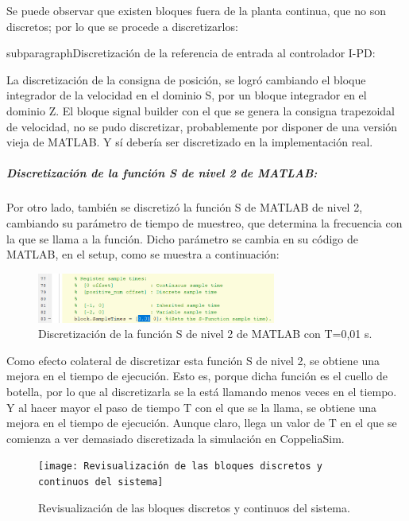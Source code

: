 \documentclass{article}
\begin{document}
\begin{sloppypar}
Se puede observar que existen bloques fuera de la planta continua, que no son discretos; por lo que se procede a discretizarlos:

subparagraph{Discretización de la referencia de entrada al controlador I-PD:}
\label{sec:Discretización de la referencia de entrada al controlador I-PD:}
\hfill

La discretización de la consigna de posición, se logró cambiando el bloque integrador de la velocidad en el dominio S, por un bloque integrador en el dominio Z. El bloque signal builder con el que se genera la consigna trapezoidal de velocidad, no se pudo discretizar, probablemente por disponer de una versión vieja de MATLAB. Y sí debería ser discretizado en la implementación real.

\subparagraph{Discretización de la función S de nivel 2 de MATLAB:}
\label{sec:Discretización de la función S de nivel 2 de MATLAB:}
\hfill

Por otro lado, también se discretizó la función S de MATLAB de nivel 2, cambiando su parámetro de tiempo de muestreo, que determina la frecuencia con la que se llama a la función. Dicho parámetro se cambia en su código de MATLAB, en el setup, como se muestra a continuación:

\begin{figure}[H]
    \centering
    \includegraphics[width=0.7\textwidth]{Discretización de la función S de nivel 2 de MATLAB con T=0,01 s}
    \caption{Discretización de la función S de nivel 2 de MATLAB con T=0,01 s.}
    \label{fig:Discretización de la función S de nivel 2 de MATLAB con T=0,01 s}
\end{figure}

Como efecto colateral de discretizar esta función S de nivel 2, se obtiene una mejora en el tiempo de ejecución. Esto es, porque dicha función es el cuello de botella, por lo que al discretizarla se la está llamando menos veces en el tiempo. Y al hacer mayor el paso de tiempo T con el que se la llama, se obtiene una mejora en el tiempo de ejecución. Aunque claro, llega un valor de T en el que se comienza a ver demasiado discretizada la simulación en CoppeliaSim.

\begin{figure}[H]
    \centering
    \texttt{[image: Revisualización de las bloques discretos y continuos del sistema]}
    \caption{Revisualización de las bloques discretos y continuos del sistema.}
    \label{fig:Revisualización de las bloques discretos y continuos del sistema}
\end{figure}







\end{sloppypar}
\end{document}
